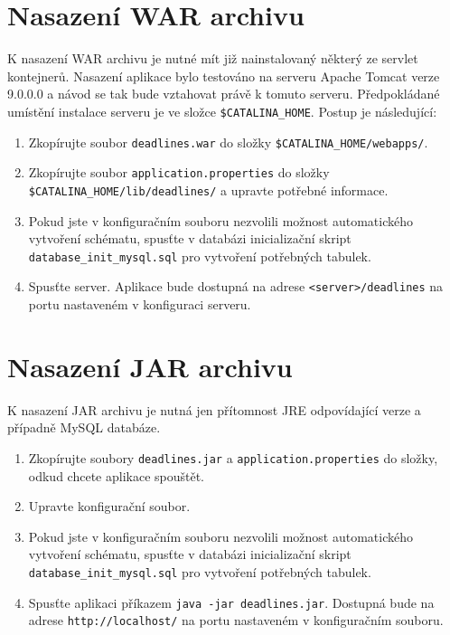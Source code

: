 \documentclass[thesis=B,czech]{FITthesis}[2012/06/26]
\begin{document}
	\section{Nasazení WAR archivu}
		K nasazení WAR archivu je nutné mít již nainstalovaný některý ze servlet kontejnerů. Nasazení aplikace bylo testováno na serveru Apache Tomcat verze 9.0.0.0 a návod se tak bude vztahovat právě k tomuto serveru. Předpokládané umístění instalace serveru je ve složce \texttt{\$CATALINA\_HOME}. Postup je následující:
		\begin{enumerate}
			\item Zkopírujte soubor \texttt{deadlines.war} do složky \texttt{\$CATALINA\_HOME/\allowbreak webapps/}.
			\item Zkopírujte soubor \texttt{application.properties} do složky \texttt{\$CATALINA\_HOME/\allowbreak lib/\allowbreak deadlines/} a upravte potřebné informace.
			\item Pokud jste v konfiguračním souboru nezvolili možnost automatického vytvoření schématu, spusťte v databázi inicializační skript \texttt{database\allowbreak \_init\allowbreak \_mysql.sql} pro vytvoření potřebných tabulek.
			\item Spusťte server. Aplikace bude dostupná na adrese \texttt{<server>/deadlines} na portu nastaveném v konfiguraci serveru.
		\end{enumerate}
	
	\section{Nasazení JAR archivu}
		K nasazení JAR archivu je nutná jen přítomnost JRE odpovídající verze a případně MySQL databáze.
		\begin{enumerate}
			\item Zkopírujte soubory \texttt{deadlines.jar} a \texttt{application.properties} do složky, odkud chcete aplikace spouštět.
			\item Upravte konfigurační soubor.
			\item Pokud jste v konfiguračním souboru nezvolili možnost automatického vytvoření schématu, spusťte v databázi inicializační skript \texttt{database\allowbreak \_init\allowbreak \_mysql.sql} pro vytvoření potřebných tabulek.
			\item Spusťte aplikaci příkazem \texttt{java -jar deadlines.jar}. Dostupná bude na adrese \texttt{http://localhost/} na portu nastaveném v konfiguračním souboru.
		\end{enumerate}
		
\end{document}
